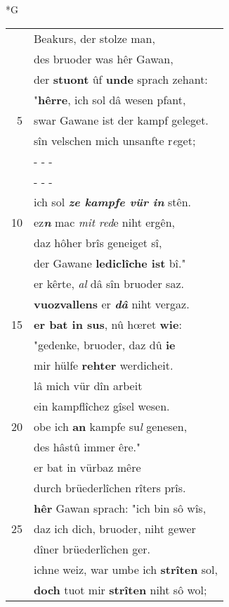 \documentclass[8pt,a4paper,notitlepage]{article}
\begin{document}
\newpage
\begin{table}[ht]
\begin{minipage}[t]{0.5\linewidth}
\small
\begin{center}*G
\end{center}
\begin{tabular}{rl}
 & Beakurs, der stolze man,\\ 
 & des bruoder was hêr Gawan,\\ 
 & der \textbf{stuont} ûf \textbf{unde} sprach zehant:\\ 
 & "\textbf{hêrre}, ich sol dâ wesen pfant,\\ 
5 & swar Gawane ist der kampf geleget.\\ 
 & sîn velschen mich unsanfte r\textit{e}get;\\ 
 & \multicolumn{1}{l}{ - - - }\\ 
 & \multicolumn{1}{l}{ - - - }\\ 
 & ich sol \textit{\textbf{ze kampfe vür in}} stên.\\ 
10 & ez\textit{\textbf{n}} mac \textit{mit red}e niht ergên,\\ 
 & daz hôher brîs geneiget sî,\\ 
 & der Gawane \textbf{lediclîche ist} bî."\\ 
 & er kêrte, \textit{al} dâ sîn bruoder saz.\\ 
 & \textbf{vuozvallens} er \textit{\textbf{dâ}} niht vergaz.\\ 
15 & \textbf{er bat in sus}, nû hœret \textbf{wie}:\\ 
 & "gedenke, bruoder, daz dû \textbf{ie}\\ 
 & mir hülfe \textbf{rehter} werdicheit.\\ 
 & lâ mich vür dîn arbeit\\ 
 & ein kampflîchez gîsel wesen.\\ 
20 & obe ich \textbf{an} kampfe su\textit{l} genesen,\\ 
 & des hâstû immer êre."\\ 
 & er bat in vürbaz mêre\\ 
 & durch brüederlîchen rîters prîs.\\ 
 & \textbf{hêr} Gawan sprach: "ich bin sô wîs,\\ 
25 & daz ich dich, bruoder, niht gewer\\ 
 & dîner brüederlîchen ger.\\ 
 & ichne weiz, war umbe ich \textbf{strîten} sol,\\ 
 & \textbf{doch} tuot mir \textbf{strîten} niht sô wol;\\ 

\end{tabular}
\end{minipage}
\end{table}
\end{document}
